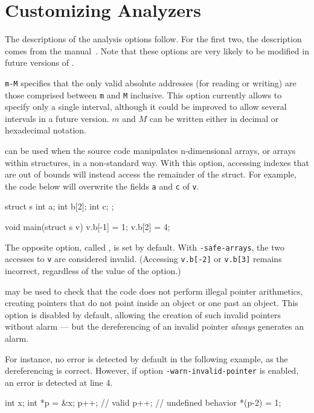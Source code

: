 \section{Customizing Analyzers}\label{sec:customizing-analyzers}

The descriptions of the analysis options follow. For the first two, the
description comes from the \Value manual~\cite{value}. Note that
these options are very likely to be modified in future versions of \FramaC.

\begin{description}
\item {} \texttt{m-M}
specifies that the only valid absolute addresses (for reading or writing)
are those comprised between \lstinline$m$ and \lstinline$M$ inclusive.
This option currently allows to specify only a single interval,
although it could be improved to allow several intervals
in a future version. $m$ and $M$
can be written either in decimal or hexadecimal notation.

\item {} can be used when the source
code manipulates n-dimensional arrays, or arrays within structures,
in a non-standard way. With this option, accessing
indexes that are out of bounds will instead access
the remainder of the struct. For example, the code below will overwrite
the fields \lstinline|a| and \lstinline|c| of \lstinline|v|.
\begin{ccode}
struct s {
  int a;
  int b[2];
  int c;
};

void main(struct s v) {
  v.b[-1] = 1;
  v.b[2] = 4;
}
\end{ccode}
The opposite option, called , is set by default.
With \texttt{-safe-arrays}, the two accesses to \lstinline|v| are considered
invalid. (Accessing \lstinline|v.b[-2]| or \lstinline|v.b[3]| remains incorrect,
regardless of the value of the option.)

\item {} may be used to check that the code
  does not perform illegal pointer arithmetics, creating pointers that do not
  point inside an object or one past an object.
  This option is disabled by default, allowing the creation of such invalid
  pointers without alarm — but the dereferencing of an invalid pointer
  \emph{always} generates an alarm.

  For instance, no error is detected by default in the following example, as
  the dereferencing is correct. However, if option
  \texttt{-warn-invalid-pointer} is enabled, an error is detected at line 4.
\begin{ccode}
int x;
int *p = &x;
p++;  // valid
p++;  // undefined behavior
*(p-2) = 1;
\end{ccode}


\end{description}

